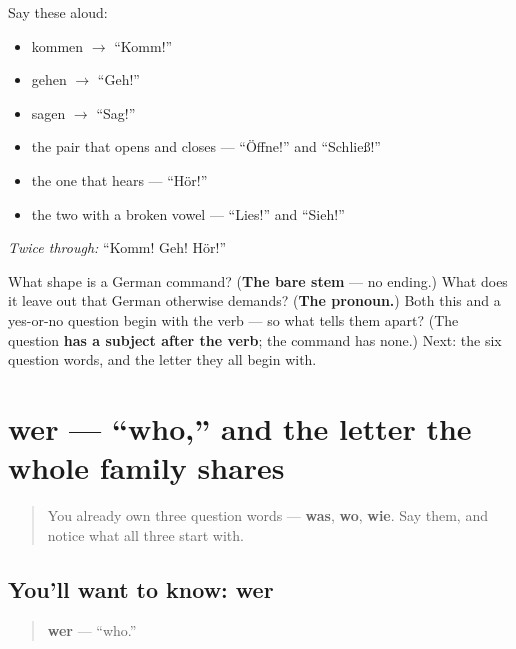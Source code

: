 Say these aloud:

\begin{itemize}
\raggedright
  \item kommen $\to$ \textquotedblleft{}Komm!\textquotedblright{}
  \item gehen $\to$ \textquotedblleft{}Geh!\textquotedblright{}
  \item sagen $\to$ \textquotedblleft{}Sag!\textquotedblright{}
  \item the pair that opens and closes — \textquotedblleft{}Öffne!\textquotedblright{} and \textquotedblleft{}Schließ!\textquotedblright{}
  \item the one that hears — \textquotedblleft{}Hör!\textquotedblright{}
  \item the two with a broken vowel — \textquotedblleft{}Lies!\textquotedblright{} and \textquotedblleft{}Sieh!\textquotedblright{}
\end{itemize}

\emph{Twice through:} \textquotedblleft{}Komm! Geh! Hör!\textquotedblright{}

\begin{tcolorbox}[breakable,colback=teal!4,colframe=teal!35!black,title={Before you move on}]
What shape is a German command? (\textbf{The bare stem} — no ending.) What does it leave out that German otherwise demands? (\textbf{The pronoun.}) Both this and a yes-or-no question begin with the verb — so what tells them apart? (The question \textbf{has a subject after the verb}; the command has none.) Next: the six question words, and the letter they all begin with.
\end{tcolorbox}
\section[wer]{wer — \textquotedblleft{}who,\textquotedblright{} and the letter the whole family shares}

\label{lesson:GE-C33-wer}



\begin{quote}
You already own three question words — \textbf{was}, \textbf{wo}, \textbf{wie}. Say them, and notice what all three start with.
\end{quote}

\subsection*{You'll want to know: wer}
\begin{quote}
\textbf{wer} — \textquotedblleft{}who.\textquotedblright{}
\end{quote}

